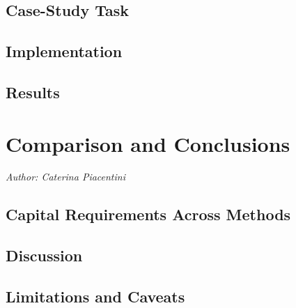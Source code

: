 \documentclass[
  11pt,
]{article}
\begin{document}
\subsection{Case-Study Task}\label{case-study-task-4}

\subsection{Implementation}\label{implementation-2}

\subsection{Results}\label{results-2}

\section{Comparison and Conclusions}\label{sec:comp}

\emph{Author: Caterina Piacentini}

\subsection{Capital Requirements Across
Methods}\label{capital-requirements-across-methods}

\subsection{Discussion}\label{discussion}

\subsection{Limitations and Caveats}\label{limitations-and-caveats}
\end{document}
